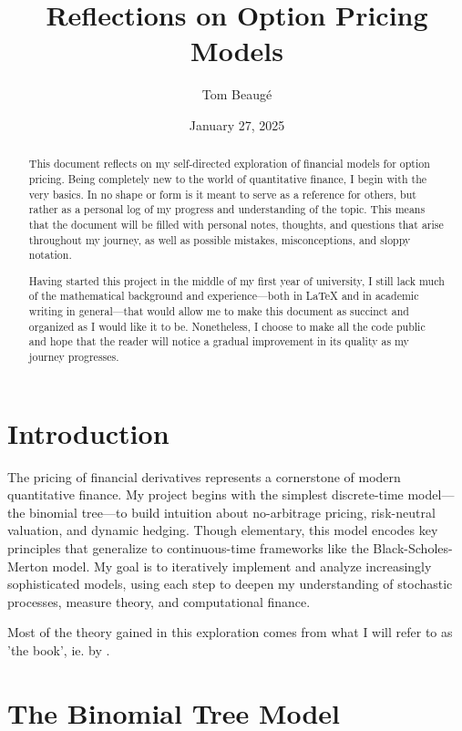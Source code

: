 \documentclass{article}
\title{Reflections on Option Pricing Models}
\author{Tom Beaugé}
\date{January 27, 2025}
\begin{document}
    \maketitle

    \begin{abstract}
        This document reflects on my self-directed exploration of financial models for option pricing. Being completely new to the world of quantitative finance, I begin with the very basics. In no shape or form is it meant to serve as a reference for others, but rather as a personal log of my progress and understanding of the topic. This means that the document will be filled with personal notes, thoughts, and questions that arise throughout my journey, as well as possible mistakes, misconceptions, and sloppy notation.
        
        \medskip

        Having started this project in the middle of my first year of university, I still lack much of the mathematical background and experience—both in LaTeX and in academic writing in general—that would allow me to make this document as succinct and organized as I would like it to be. Nonetheless, I choose to make all the code public and hope that the reader will notice a gradual improvement in its quality as my journey progresses.
    \end{abstract}

    \section{Introduction}
    \label{sec:introduction}

    The pricing of financial derivatives represents a cornerstone of modern quantitative finance. My project begins with the simplest discrete-time model---the binomial tree---to build intuition about no-arbitrage pricing, risk-neutral valuation, and dynamic hedging. Though elementary, this model encodes key principles that generalize to continuous-time frameworks like the Black-Scholes-Merton model. My goal is to iteratively implement and analyze increasingly sophisticated models, using each step to deepen my understanding of stochastic processes, measure theory, and computational finance.

    Most of the theory gained in this exploration comes from what I will refer to as 'the book', ie.  by \citeauthor{Wilmott2006}.

    \section{The Binomial Tree Model}
    \label{sec:binomial}
\end{document}
